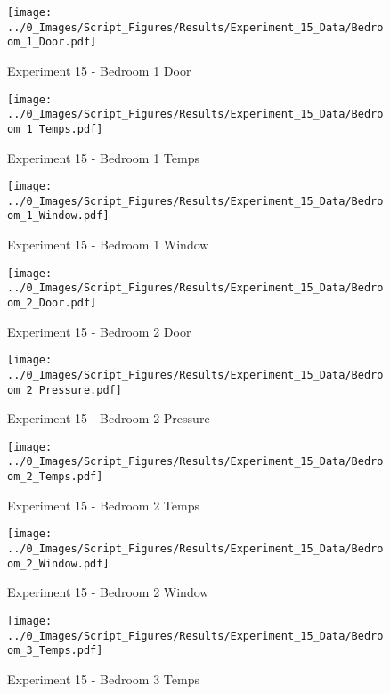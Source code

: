 	\begin{figure}[H]
		\centering
		\texttt{[image: ../0\_Images/Script\_Figures/Results/Experiment\_15\_Data/Bedroom\_1\_Door.pdf]}
		\caption[]{Experiment 15 - Bedroom 1 Door}
	\end{figure}
 

	\begin{figure}[H]
		\centering
		\texttt{[image: ../0\_Images/Script\_Figures/Results/Experiment\_15\_Data/Bedroom\_1\_Temps.pdf]}
		\caption[]{Experiment 15 - Bedroom 1 Temps}
	\end{figure}
 
	\clearpage

	\begin{figure}[H]
		\centering
		\texttt{[image: ../0\_Images/Script\_Figures/Results/Experiment\_15\_Data/Bedroom\_1\_Window.pdf]}
		\caption[]{Experiment 15 - Bedroom 1 Window}
	\end{figure}
 

	\begin{figure}[H]
		\centering
		\texttt{[image: ../0\_Images/Script\_Figures/Results/Experiment\_15\_Data/Bedroom\_2\_Door.pdf]}
		\caption[]{Experiment 15 - Bedroom 2 Door}
	\end{figure}
 
	\clearpage

	\begin{figure}[H]
		\centering
		\texttt{[image: ../0\_Images/Script\_Figures/Results/Experiment\_15\_Data/Bedroom\_2\_Pressure.pdf]}
		\caption[]{Experiment 15 - Bedroom 2 Pressure}
	\end{figure}
 

	\begin{figure}[H]
		\centering
		\texttt{[image: ../0\_Images/Script\_Figures/Results/Experiment\_15\_Data/Bedroom\_2\_Temps.pdf]}
		\caption[]{Experiment 15 - Bedroom 2 Temps}
	\end{figure}
 
	\clearpage

	\begin{figure}[H]
		\centering
		\texttt{[image: ../0\_Images/Script\_Figures/Results/Experiment\_15\_Data/Bedroom\_2\_Window.pdf]}
		\caption[]{Experiment 15 - Bedroom 2 Window}
	\end{figure}
 

	\begin{figure}[H]
		\centering
		\texttt{[image: ../0\_Images/Script\_Figures/Results/Experiment\_15\_Data/Bedroom\_3\_Temps.pdf]}
		\caption[]{Experiment 15 - Bedroom 3 Temps}
	\end{figure}
 
